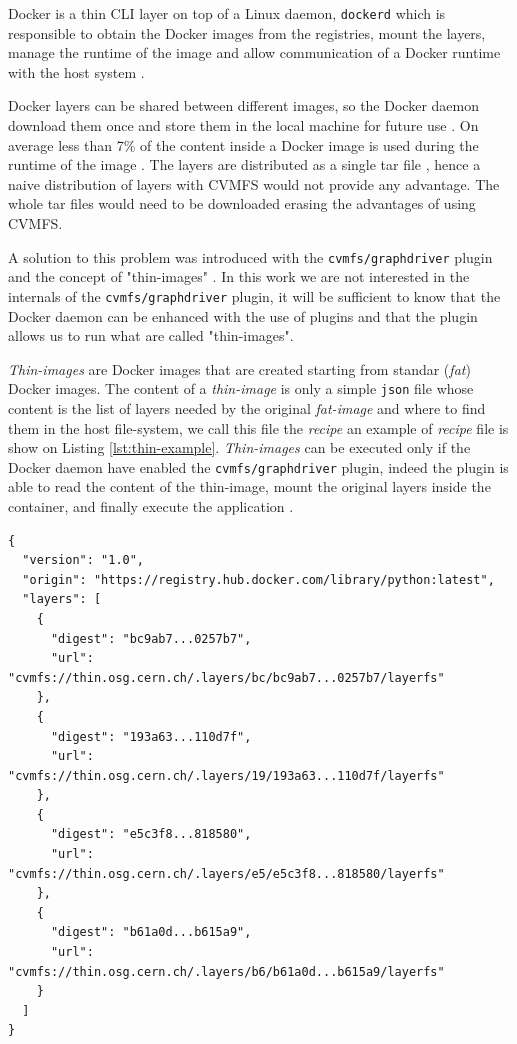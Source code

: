 Docker is a thin CLI layer on top of a Linux daemon, \texttt{dockerd} which is
responsible to obtain the Docker images from the registries, mount the layers,
manage the runtime of the image and allow communication of a Docker runtime
with the host system \cite{docker:overview}.

Docker layers can be shared between different images, so the Docker daemon
download them once and store them in the local machine for future use
\cite{docker:storage}. On average less than 7\% of the content inside a Docker
image is used during the runtime of the image \cite{slacker}. The layers are
distributed as a single tar file \cite{oci:image-filesystem}, hence a naive
distribution of layers with CVMFS would not provide any advantage. The whole
tar files would need to be downloaded erasing the advantages of using CVMFS.

A solution to this problem was introduced with the \texttt{cvmfs/graphdriver}
plugin and the concept of "thin-images" \cite{graphdriver-plugin}. In this work
we are not interested in the internals of the \texttt{cvmfs/graphdriver} plugin,
it will be sufficient to know that the Docker daemon can be enhanced with the
use of plugins \cite{docker:plugin} and that the plugin allows us to run what
are called "thin-images".

\textit{Thin-images} are Docker images that are created starting from standar
(\textit{fat}) Docker images. The content of a \textit{thin-image} is only a
simple \texttt{json} file whose content is the list of layers needed by the
original \textit{fat-image} and where to find them in the host file-system, we
call this file the \textit{recipe} an example of \textit{recipe} file is show
on Listing \ref{lst:thin-example}. \textit{Thin-images} can be executed only if
the Docker daemon have enabled the \texttt{cvmfs/graphdriver} plugin, indeed
the plugin is able to read the content of the thin-image, mount the original
layers inside the container, and finally execute the application
\cite{graphdriver-plugin}.

\begin{minipage}{\linewidth}
\begin{lstlisting}[caption={Example of a \textit{recipe} file of a Docker \textit{thin image}},label={lst:thin-example}]
{
  "version": "1.0",
  "origin": "https://registry.hub.docker.com/library/python:latest",
  "layers": [
    {
      "digest": "bc9ab7...0257b7",
      "url": "cvmfs://thin.osg.cern.ch/.layers/bc/bc9ab7...0257b7/layerfs"
    },
    {
      "digest": "193a63...110d7f",
      "url": "cvmfs://thin.osg.cern.ch/.layers/19/193a63...110d7f/layerfs"
    },
    {
      "digest": "e5c3f8...818580",
      "url": "cvmfs://thin.osg.cern.ch/.layers/e5/e5c3f8...818580/layerfs"
    },
    {
      "digest": "b61a0d...b615a9",
      "url": "cvmfs://thin.osg.cern.ch/.layers/b6/b61a0d...b615a9/layerfs"
    }
  ]
}
\end{lstlisting}
\end{minipage}



